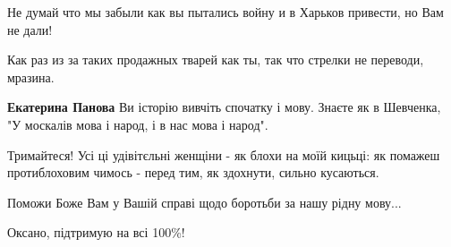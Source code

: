 \begin{itemize}
\begin{itemize}
Не думай что мы забыли как вы пытались войну и в Харьков привести, но Вам не
дали!

 
Как раз из за таких продажных тварей как ты, так что стрелки не переводи, мразина.

 
\textbf{Екатерина Панова} Ви історію вивчіть спочатку і мову. Знаєте як в
Шевченка, "У москалів мова і народ, і в нас мова і народ".

\end{itemize}

 

Тримайтеся! Усі ці удівітєльні женщіни - як блохи на моїй кицьці: як помажеш
протиблоховим чимось - перед тим, як здохнути, сильно кусаються.


 
Поможи Боже Вам у Вашій справі щодо боротьби за нашу рідну мову...

 
Оксано, підтримую на всі 100\%!

 

\end{itemize}
